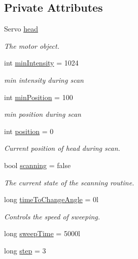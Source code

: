 \subsection*{Private Attributes}
\begin{DoxyCompactItemize}
\item 
Servo \hyperlink{classFireFinder_ac6a7b4e986e63cddb3f010e8909c00f8}{head}
\begin{DoxyCompactList}\small\item\em The motor object. \end{DoxyCompactList}\item 
int \hyperlink{classFireFinder_a7d3912a911843b60de3468588cfe8579}{min\-Intensity} = 1024
\begin{DoxyCompactList}\small\item\em min intensity during scan \end{DoxyCompactList}\item 
int \hyperlink{classFireFinder_ad8be0837d88f10d65b6f8a405f29494a}{min\-Position} = 100
\begin{DoxyCompactList}\small\item\em min position during scan \end{DoxyCompactList}\item 
int \hyperlink{classFireFinder_a40e204a2807939b3195024f14a9278fc}{position} = 0
\begin{DoxyCompactList}\small\item\em Current position of head during scan. \end{DoxyCompactList}\item 
bool \hyperlink{classFireFinder_aec1a3ae4b80847a907898601c64386cb}{scanning} = false
\begin{DoxyCompactList}\small\item\em The current state of the scanning routine. \end{DoxyCompactList}\item 
long \hyperlink{classFireFinder_a97b1a598ddb7886feb4a96a4931cc103}{time\-To\-Change\-Angle} = 0l
\begin{DoxyCompactList}\small\item\em Controls the speed of sweeping. \end{DoxyCompactList}\item 
long \hyperlink{classFireFinder_aaa38192d82bc4120129b72fee61f72f1}{sweep\-Time} = 5000l
\item 
long \hyperlink{classFireFinder_ad482526cf32997919cbc31f61d12065d}{step} = 3
\end{DoxyCompactItemize}
